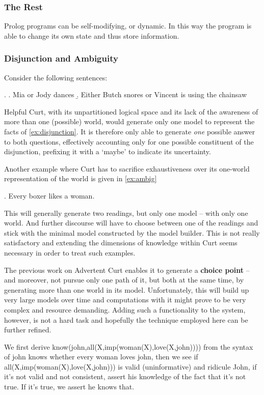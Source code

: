 \documentclass[a4paper]{article}
\newcommand{\term}[1]{\textsf{\textbf{#1}}} %
\newcommand{\pn}{\textsf} %
\newcommand{\curt}{\pn{Curt}}
\newcommand{\acurt}{\pn{Advertent Curt}}
\newcommand{\prol}{\pn{Prolog}}
\theoremstyle{remark}
\theoremstyle{remark}
\theoremstyle{definition}
\theoremstyle{definition}
\begin{document}
\subsubsection{The Rest}

\prol{} programs can be self-modifying, or dynamic. In this way the program is
able to change its own state and thus store information.

\subsubsection{Disjunction and Ambiguity}
Consider the following sentences:

\ex. \label{ex:disjunction} \a. Mia or Jody dances
\b. Either Butch snores or Vincent is using the chainsaw

\pn{Helpful Curt}, with its unpartitioned logical space and its lack of
the awareness of more than one (possible) world, would generate only one model
to represent the facts of \ref{ex:disjunction}. It is therefore only able to
generate \emph{one} possible answer to both questions, effectively accounting only
for one possible constituent of the disjunction, prefixing it with a `maybe' to
indicate its uncertainty.

Another example where \curt{} has to sacrifice exhaustiveness over its one-world
representation of the world is given in \ref{ex:ambig}

\ex.\label{ex:ambig} Every boxer likes a woman.

This will generally generate two readings, but only one model -- with only one
world. And further discourse will have to choose between one of the readings and
stick with the minimal model constructed by the model builder. This is not
really satisfactory and extending the dimensions of knowledge within \curt{} seems
necessary in order to treat such examples.

The previous work on \acurt{} enables it to generate a \term{choice point} -- and
moreover, not pursue only one path of it, but both at the same time, by
generating more than one world in its model.
Unfortunately, this will build up very large models over time and computations
with it might prove to be very complex and resource demanding. Adding such a
functionality to the system, however, is not a hard task and hopefully the
technique employed here can be further refined. %

We first derive know(john,all(X,imp(woman(X),love(X,john)))) from the syntax of
john knows whether every woman loves john, then we see if
all(X,imp(woman(X),love(X,john))) is valid (uninformative) and ridicule John, if
it's not valid and not consistent, assert his knowledge of the fact that it's
not true. If it's true, we assert he knows that.
\end{document}
